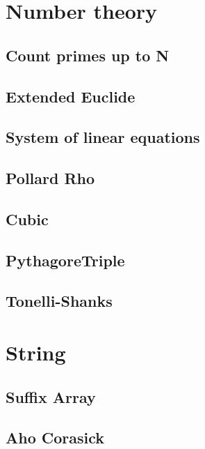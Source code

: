 \section{Number theory}
\subsection{Count primes up to N}
\raggedbottom
\hrulefill
\subsection{Extended Euclide}
\raggedbottom
\hrulefill
\subsection{System of linear equations}
\raggedbottom
\hrulefill
\subsection{Pollard Rho}
\raggedbottom
\hrulefill
\subsection{Cubic}
\raggedbottom
\hrulefill
\subsection{PythagoreTriple}
\raggedbottom
\hrulefill
\subsection{Tonelli-Shanks}
\raggedbottom
\hrulefill

\section{String}
\subsection{Suffix Array}
\raggedbottom
\hrulefill
\subsection{Aho Corasick}
\raggedbottom
\hrulefill
